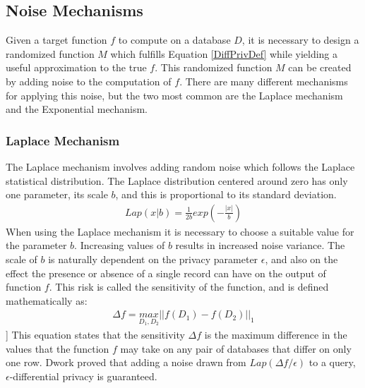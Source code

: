 \subsection{Noise Mechanisms}
Given a target function $f$ to compute on a database $D$, it is necessary to design a randomized function $M$ which fulfills Equation \ref{DiffPrivDef} while yielding a useful approximation to the true $f$. This randomized function $M$ can be created by adding noise to the computation of $f$. There are many different mechanisms for applying this noise, but the two most common are the Laplace mechanism and the Exponential mechanism. 

\subsubsection{Laplace Mechanism}
The Laplace mechanism involves adding random noise which follows the Laplace statistical distribution. The Laplace distribution centered around zero has only one parameter, its scale $b$, and this is proportional to its standard deviation. 
\begin{eqnarray} \label{LaplaceDisDef}
Lap(x|b) = \frac{1}{2b} exp (-\frac{|x|}{b})
\end{eqnarray}
When using the Laplace mechanism it is necessary to choose a suitable value for the parameter $b$. Increasing values of $b$ results in increased noise variance. The scale of $b$ is naturally dependent on the privacy parameter $\epsilon$, and also on the effect the presence or absence of a single record can have on the output of function $f$. This risk is called the sensitivity of the function, and is defined mathematically as:
\begin{eqnarray} \label{eq:sensitivity_def}
\Delta f=\underset{D_1,D_2}{max}||\mathit{f(D_1)}-\mathit{f(D_2)}||_{1}
 \end{eqnarray}
  ]
This equation states that the sensitivity $\Delta f$ is the maximum difference in the values that the function $f$ may take on any pair of databases that differ on only one row. Dwork proved that adding a noise drawn from $Lap(\Delta f/\epsilon)$ to a query, $\epsilon$-differential privacy is guaranteed\citep{dwork2013algorithmic}. 

